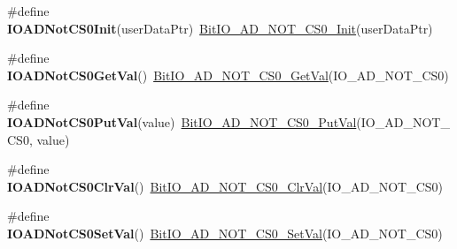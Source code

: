\begin{DoxyCompactItemize}
\item 
\hypertarget{group___func_ala_gae7a5315ebee87b7c5fed7eb382ea999b}{\#define {\bfseries I\-O\-A\-D\-Not\-C\-S0\-Init}(user\-Data\-Ptr)~\hyperlink{group___bit_i_o___a_d___n_o_t___c_s0__module_ga327b32c439270281e76ce9b84ee9a70c}{Bit\-I\-O\-\_\-\-A\-D\-\_\-\-N\-O\-T\-\_\-\-C\-S0\-\_\-\-Init}(user\-Data\-Ptr)}\label{group___func_ala_gae7a5315ebee87b7c5fed7eb382ea999b}

\item 
\hypertarget{group___func_ala_ga26e5f7f6e3a19d82777261dbde37af30}{\#define {\bfseries I\-O\-A\-D\-Not\-C\-S0\-Get\-Val}()~\hyperlink{group___bit_i_o___a_d___n_o_t___c_s0__module_gad587b90bb72fefd0b3d60234dc31812a}{Bit\-I\-O\-\_\-\-A\-D\-\_\-\-N\-O\-T\-\_\-\-C\-S0\-\_\-\-Get\-Val}(I\-O\-\_\-\-A\-D\-\_\-\-N\-O\-T\-\_\-\-C\-S0)}\label{group___func_ala_ga26e5f7f6e3a19d82777261dbde37af30}

\item 
\hypertarget{group___func_ala_ga8fc681b6e65626ce89b62afae12148eb}{\#define {\bfseries I\-O\-A\-D\-Not\-C\-S0\-Put\-Val}(value)~\hyperlink{group___bit_i_o___a_d___n_o_t___c_s0__module_ga208aa26a7fea5ab2892ed0054c042390}{Bit\-I\-O\-\_\-\-A\-D\-\_\-\-N\-O\-T\-\_\-\-C\-S0\-\_\-\-Put\-Val}(I\-O\-\_\-\-A\-D\-\_\-\-N\-O\-T\-\_\-\-C\-S0, value)}\label{group___func_ala_ga8fc681b6e65626ce89b62afae12148eb}

\item 
\hypertarget{group___func_ala_gae03e085f608ad12e1db521dad372e5d9}{\#define {\bfseries I\-O\-A\-D\-Not\-C\-S0\-Clr\-Val}()~\hyperlink{group___bit_i_o___a_d___n_o_t___c_s0__module_gafbc0ab82d9d680e72cee89141cb9acc6}{Bit\-I\-O\-\_\-\-A\-D\-\_\-\-N\-O\-T\-\_\-\-C\-S0\-\_\-\-Clr\-Val}(I\-O\-\_\-\-A\-D\-\_\-\-N\-O\-T\-\_\-\-C\-S0)}\label{group___func_ala_gae03e085f608ad12e1db521dad372e5d9}

\item 
\hypertarget{group___func_ala_ga3c82c7a6e49ab269a96f5eb8dc756f65}{\#define {\bfseries I\-O\-A\-D\-Not\-C\-S0\-Set\-Val}()~\hyperlink{group___bit_i_o___a_d___n_o_t___c_s0__module_ga05305111ba43d0bacaa14a569bc2a75f}{Bit\-I\-O\-\_\-\-A\-D\-\_\-\-N\-O\-T\-\_\-\-C\-S0\-\_\-\-Set\-Val}(I\-O\-\_\-\-A\-D\-\_\-\-N\-O\-T\-\_\-\-C\-S0)}\label{group___func_ala_ga3c82c7a6e49ab269a96f5eb8dc756f65}

\end{DoxyCompactItemize}
